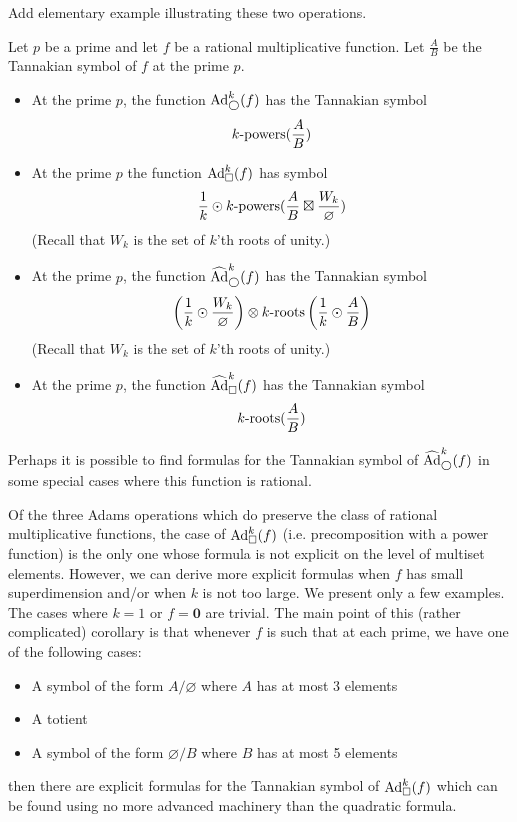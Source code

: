 \begin{example}
Add elementary example illustrating these two operations.
\end{example}

\begin{theorem}
Let $p$ be a prime and let $f$ be a rational multiplicative function. Let $\frac{A}{B}$ be the Tannakian symbol of $f$ at the prime $p$. 
\begin{itemize}
\item At the prime $p$, the function $\text{Ad}^{k}_{\bigcirc}(f)$ has the Tannakian symbol 
$${k}\text{-powers}(\frac{A}{B})$$

\item At the prime $p$ the function $\text{Ad}^{k}_{\square}(f)$ has symbol 
$$\frac{1}{k} \odot {k}\text{-powers}(\frac{A}{B} \boxtimes \frac{W_k}{\varnothing})$$
(Recall that $W_k$ is the set of $k$'th roots of unity.) 
\item At the prime $p$, the function $\widehat{\text{Ad}}^{k}_{\bigcirc}(f)$ has the Tannakian symbol
$$\left(\frac{1}{k} \odot\frac{W_k}{\varnothing}\right) \otimes {k}\text{-roots}\left(\frac{1}{k} \odot \frac{A}{B}\right)
$$
(Recall that $W_k$ is the set of $k$'th roots of unity.) 
\item At the prime $p$, the function $\widehat{\text{Ad}}^{k}_{\square}(f)$ has the Tannakian symbol 
$${k}\text{-roots}(\frac{A}{B})$$
\end{itemize}
\end{theorem}

\begin{remark}
Perhaps it is possible to find formulas for the Tannakian symbol of $\widehat{\text{Ad}}^{k}_{\bigcirc}(f)$ in some special cases where this function is rational. 
\end{remark}



Of the three Adams operations which do preserve the class of rational multiplicative functions, the case of $\text{Ad}^{k}_{\square}(f)$ (i.e. precomposition with a power function) is the only one whose formula is not explicit on the level of multiset elements. However, we can derive more explicit formulas when $f$ has small superdimension and/or when $k$ is not too large. We present only a few examples. The cases where $k=1$ or $f= \mathbf{0}$ are trivial. The main point of this (rather complicated) corollary is that whenever $f$ is such that at each prime, we have one of the following cases:
\begin{itemize}
\item A symbol of the form $A/ \varnothing$ where $A$ has at most 3 elements
\item A totient
\item A symbol of the form $\varnothing / B$ where $B$ has at most 5 elements
\end{itemize}
then there are explicit formulas for the Tannakian symbol of $\text{Ad}^{k}_{\square}(f)$ which can be found using no more advanced machinery than the quadratic formula.

